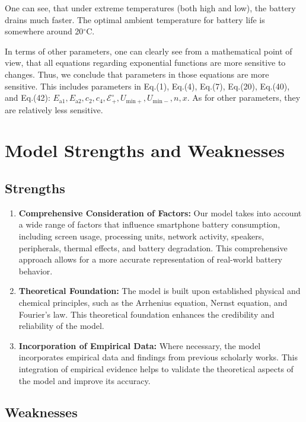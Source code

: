 \documentclass[12pt]{article}
\begin{document}
One can see, that under extreme temperatures (both high and low), the battery drains much faster. The optimal ambient temperature for battery life is somewhere around 20$^\circ$C.

In terms of other parameters, one can clearly see from a mathematical point of view, that all equations regarding exponential functions are more sensitive to changes. Thus, we conclude that parameters in those equations are more sensitive. This includes parameters in Eq.(1), Eq.(4), Eq.(7), Eq.(20), Eq.(40), and Eq.(42): $E_\mathrm{a1}, E_\mathrm{a2}, c_2, c_4, \mathcal E^{\circ}_+, U_\mathrm{min+}, U_\mathrm{min-}, n, x$. As for other parameters, they are relatively less sensitive.

\section{Model Strengths and Weaknesses}

\subsection{Strengths}

\begin{enumerate}
	\item \textbf{Comprehensive Consideration of Factors:} Our model takes into account a wide range of factors that influence smartphone battery consumption, including screen usage, processing units, network activity, speakers, peripherals, thermal effects, and battery degradation. This comprehensive approach allows for a more accurate representation of real-world battery behavior.
	\item \textbf{Theoretical Foundation:} The model is built upon established physical and chemical principles, such as the Arrhenius equation, Nernst equation, and Fourier's law. This theoretical foundation enhances the credibility and reliability of the model.
	\item \textbf{Incorporation of Empirical Data:} Where necessary, the model incorporates empirical data and findings from previous scholarly works. This integration of empirical evidence helps to validate the theoretical aspects of the model and improve its accuracy.
\end{enumerate}

\subsection{Weaknesses}
\end{document}
